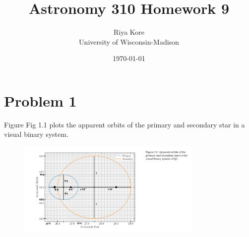 \documentclass[10pt]{article}
\def \MYID{Riya Kore}
\begin{document}
\pagestyle{fancy}
\fancyhf{}
\fancyfoot[C]{\thepage}

\title{Astronomy 310 Homework 9}
\author{\MYID\\
University of Wisconsin-Madison}
\date{\today}
\maketitle

\section*{Problem 1}
Figure Fig 1.1 plots the apparent orbits of the primary and secondary star in a visual binary system.
\begin{figure}[h]
    \centering
    \includegraphics[width=0.8\textwidth]{hw_9_astron_310_question_image.jpg}
    \label{fig:enter-label}
\end{figure}
\end{document}
